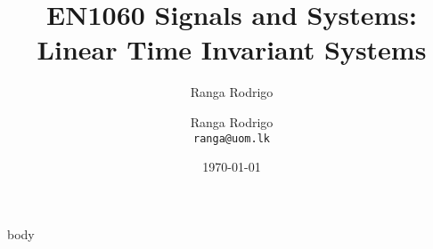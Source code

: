 \documentclass[t, aspectratio=169,xcolor={svgnames}, 10pt, handout]{beamer}
\title{EN1060 Signals and Systems: Linear Time Invariant Systems}
\author{Ranga Rodrigo}
\author[]{Ranga Rodrigo\\ \texttt{ranga@uom.lk}}
\institute[]{The University of Moratuwa, Sri Lanka}
\date{\today}
\begin{document}
    \begin{frame}
        \titlepage
    \end{frame}










    {body}








\end{document}
